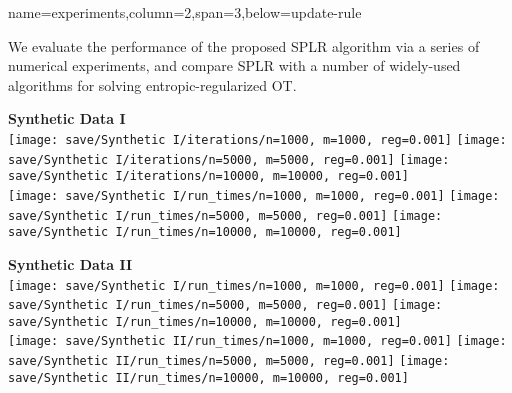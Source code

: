 {name=experiments,column=2,span=3,below=update-rule}
{
    We evaluate the performance of the proposed
    SPLR algorithm via a series of numerical experiments, and compare SPLR with a number of widely-used algorithms for solving entropic-regularized OT.

    \begin{minipage}[c]{0.48\textwidth}
        \centering
        \vspace{1em}
        {\bf\color{sufered} Synthetic Data I} \\ \vspace{0.3em}
        \texttt{[image: save/Synthetic I/iterations/n=1000, m=1000, reg=0.001]}
        \texttt{[image: save/Synthetic I/iterations/n=5000, m=5000, reg=0.001]}
        \texttt{[image: save/Synthetic I/iterations/n=10000, m=10000, reg=0.001]} \\
        \texttt{[image: save/Synthetic I/run\_times/n=1000, m=1000, reg=0.001]}
        \texttt{[image: save/Synthetic I/run\_times/n=5000, m=5000, reg=0.001]}
        \texttt{[image: save/Synthetic I/run\_times/n=10000, m=10000, reg=0.001]} \\
    \end{minipage}
    \hfill
    \begin{minipage}[c]{0.48\textwidth}
        \centering
        \vspace{1em}
        {\bf\color{sufered} Synthetic Data II} \\ \vspace{0.3em}
        \texttt{[image: save/Synthetic I/run\_times/n=1000, m=1000, reg=0.001]}
        \texttt{[image: save/Synthetic I/run\_times/n=5000, m=5000, reg=0.001]}
        \texttt{[image: save/Synthetic I/run\_times/n=10000, m=10000, reg=0.001]} \\
        \texttt{[image: save/Synthetic II/run\_times/n=1000, m=1000, reg=0.001]}
        \texttt{[image: save/Synthetic II/run\_times/n=5000, m=5000, reg=0.001]}
        \texttt{[image: save/Synthetic II/run\_times/n=10000, m=10000, reg=0.001]} \\
    \end{minipage}

}
